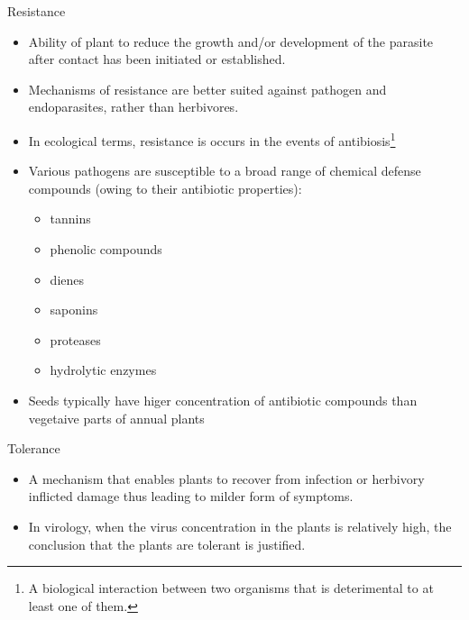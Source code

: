 \documentclass[11pt,dvipsnames,ignorenonframetext,aspectratio=169]{beamer}
\providecommand{\tightlist}{%
  \setlength{\itemsep}{0pt}\setlength{\parskip}{0pt}}
\begin{document}
\begin{frame}{Resistance}
\protect\hypertarget{resistance}{}
\begin{itemize}
\tightlist
\item
  Ability of plant to reduce the growth and/or development of the
  parasite after contact has been initiated or established.
\item
  Mechanisms of resistance are better suited against pathogen and
  endoparasites, rather than herbivores.
\item
  In ecological terms, resistance is occurs in the events of
  antibiosis\footnote[frame]{A biological interaction between two organisms that is deterimental to at least one of them.}
\item
  Various pathogens are susceptible to a broad range of chemical defense
  compounds (owing to their antibiotic properties):

  \begin{itemize}
  \tightlist
  \item
    tannins
  \item
    phenolic compounds
  \item
    dienes
  \item
    saponins
  \item
    proteases
  \item
    hydrolytic enzymes
  \end{itemize}
\item
  Seeds typically have higer concentration of antibiotic compounds than
  vegetaive parts of annual plants
\end{itemize}
\end{frame}

\begin{frame}{Tolerance}
\protect\hypertarget{tolerance}{}
\begin{itemize}
\tightlist
\item
  A mechanism that enables plants to recover from infection or herbivory
  inflicted damage thus leading to milder form of symptoms.
\item
  In virology, when the virus concentration in the plants is relatively
  high, the conclusion that the plants are tolerant is justified.
\end{itemize}
\end{frame}
\end{document}
